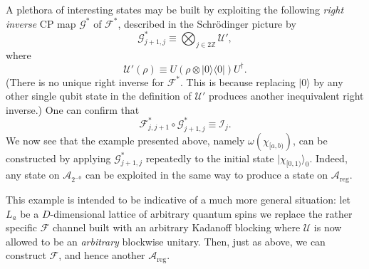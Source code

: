\documentclass[11pt]{amsart}
\theoremstyle{plain}%
\theoremstyle{definition}
\theoremstyle{remark}
\begin{document}
A plethora of interesting states may be built by exploiting the following \emph{right inverse} CP map $\mathcal{G}^{*}$ of $\mathcal{F}^{*}$, described in the Schr{\"o}dinger picture by
\begin{equation}
	\mathcal{G}_{j+1,j}^{*} \equiv \bigotimes_{j\in 2\mathbb{Z}} \mathcal{U}',
\end{equation}
where
\begin{equation}
	\mathcal{U}'(\rho) \equiv U(\rho\otimes |0\rangle\langle 0|) U^\dag.
\end{equation}
(There is no unique right inverse for $\mathcal{F}^{*}$. This is because replacing $|0\rangle$ by any other single qubit state in the definition of $\mathcal{U}'$ produces another inequivalent right inverse.)
One can confirm that
\begin{equation}
	\mathcal{F}_{j,j+1}^{*}\circ \mathcal{G}_{j+1,j}^{*} \equiv \mathcal{I}_j.
\end{equation}
We now see that the example presented above, namely $\omega(\chi_{[a,b)})$, can be constructed by applying $\mathcal{G}_{j+1,j}^{*}$ repeatedly to the initial state $|\chi_{[0,1)}\rangle_0$. Indeed, any state on $\mathcal{A}_{2^{-0}}$ can be exploited in the same way to produce a state on $\mathcal{A}_{\text{reg}}$.

This example is intended to be indicative of a much more general situation: let $L_a$ be a $D$-dimensional lattice of arbitrary quantum spins we replace the rather specific $\mathcal{F}$ channel built with an arbitrary Kadanoff blocking where $\mathcal{U}$ is now allowed to be an \emph{arbitrary} blockwise unitary. Then, just as above, we can construct $\mathcal{F}$, and hence another $\mathcal{A}_{\text{reg}}$.
\end{document}

